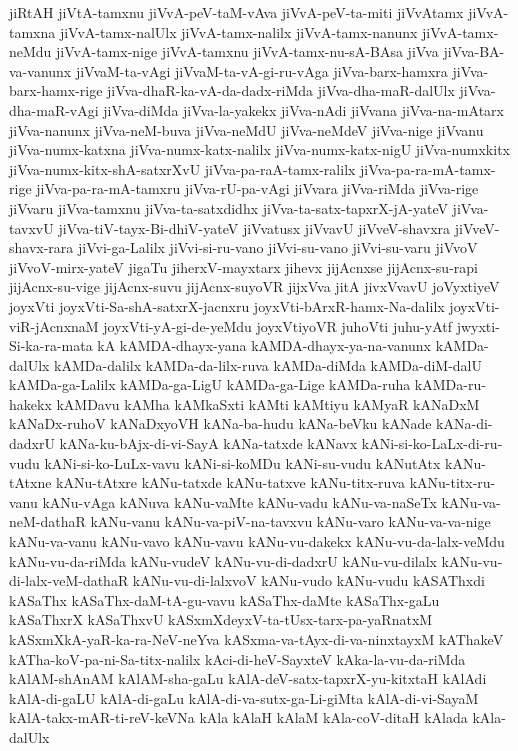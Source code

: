 {jiRtAH
jiVtA-tamxnu
jiVvA-peV-taM-vAva
jiVvA-peV-ta-miti
jiVvAtamx
jiVvA-tamxna
jiVvA-tamx-nalUlx
jiVvA-tamx-nalilx
jiVvA-tamx-nanunx
jiVvA-tamx-neMdu
jiVvA-tamx-nige
jiVvA-tamxnu
jiVvA-tamx-nu-sA-BAsa
jiVva
jiVva-BA-va-vanunx
jiVvaM-ta-vAgi
jiVvaM-ta-vA-gi-ru-vAga
jiVva-barx-hamxra
jiVva-barx-hamx-rige
jiVva-dhaR-ka-vA-da-dadx-riMda
jiVva-dha-maR-dalUlx
jiVva-dha-maR-vAgi
jiVva-diMda
jiVva-la-yakekx
jiVva-nAdi
jiVvana
jiVva-na-mAtarx
jiVva-nanunx
jiVva-neM-buva
jiVva-neMdU
jiVva-neMdeV
jiVva-nige
jiVvanu
jiVva-numx-katxna
jiVva-numx-katx-nalilx
jiVva-numx-katx-nigU
jiVva-numxkitx
jiVva-numx-kitx-shA-satxrXvU
jiVva-pa-raA-tamx-ralilx
jiVva-pa-ra-mA-tamx-rige
jiVva-pa-ra-mA-tamxru
jiVva-rU-pa-vAgi
jiVvara
jiVva-riMda
jiVva-rige
jiVvaru
jiVva-tamxnu
jiVva-ta-satxdidhx
jiVva-ta-satx-tapxrX-jA-yateV
jiVva-tavxvU
jiVva-tiV-tayx-Bi-dhiV-yateV
jiVvatusx
jiVvavU
jiVveV-shavxra
jiVveV-shavx-rara
jiVvi-ga-Lalilx
jiVvi-si-ru-vano
jiVvi-su-vano
jiVvi-su-varu
jiVvoV
jiVvoV-mirx-yateV
jigaTu
jiherxV-mayxtarx
jihevx
jijAcnxse
jijAcnx-su-rapi
jijAcnx-su-vige
jijAcnx-suvu
jijAcnx-suyoVR
jijxVva
jitA
jivxVvavU
joVyxtiyeV
joyxVti
joyxVti-Sa-shA-satxrX-jacnxru
joyxVti-bArxR-hamx-Na-dalilx
joyxVti-viR-jAcnxnaM
joyxVti-yA-gi-de-yeMdu
joyxVtiyoVR
juhoVti
juhu-yAtf
jwyxti-Si-ka-ra-mata
kA
kAMDA-dhayx-yana
kAMDA-dhayx-ya-na-vanunx
kAMDa-dalUlx
kAMDa-dalilx
kAMDa-da-lilx-ruva
kAMDa-diMda
kAMDa-diM-dalU
kAMDa-ga-Lalilx
kAMDa-ga-LigU
kAMDa-ga-Lige
kAMDa-ruha
kAMDa-ru-hakekx
kAMDavu
kAMha
kAMkaSxti
kAMti
kAMtiyu
kAMyaR
kANaDxM
kANaDx-ruhoV
kANaDxyoVH
kANa-ba-hudu
kANa-beVku
kANade
kANa-di-dadxrU
kANa-ku-bAjx-di-vi-SayA
kANa-tatxde
kANavx
kANi-si-ko-LaLx-di-ru-vudu
kANi-si-ko-LuLx-vavu
kANi-si-koMDu
kANi-su-vudu
kANutAtx
kANu-tAtxne
kANu-tAtxre
kANu-tatxde
kANu-tatxve
kANu-titx-ruva
kANu-titx-ru-vanu
kANu-vAga
kANuva
kANu-vaMte
kANu-vadu
kANu-va-naSeTx
kANu-va-neM-dathaR
kANu-vanu
kANu-va-piV-na-tavxvu
kANu-varo
kANu-va-va-nige
kANu-va-vanu
kANu-vavo
kANu-vavu
kANu-vu-dakekx
kANu-vu-da-lalx-veMdu
kANu-vu-da-riMda
kANu-vudeV
kANu-vu-di-dadxrU
kANu-vu-dilalx
kANu-vu-di-lalx-veM-dathaR
kANu-vu-di-lalxvoV
kANu-vudo
kANu-vudu
kASAThxdi
kASaThx
kASaThx-daM-tA-gu-vavu
kASaThx-daMte
kASaThx-gaLu
kASaThxrX
kASaThxvU
kASxmXdeyxV-ta-tUsx-tarx-pa-yaRnatxM
kASxmXkA-yaR-ka-ra-NeV-neYva
kASxma-va-tAyx-di-va-ninxtayxM
kAThakeV
kATha-koV-pa-ni-Sa-titx-nalilx
kAci-di-heV-SayxteV
kAka-la-vu-da-riMda
kAlAM-shAnAM
kAlAM-sha-gaLu
kAlA-deV-satx-tapxrX-yu-kitxtaH
kAlAdi
kAlA-di-gaLU
kAlA-di-gaLu
kAlA-di-va-sutx-ga-Li-giMta
kAlA-di-vi-SayaM
kAlA-takx-mAR-ti-reV-keVNa
kAla
kAlaH
kAlaM
kAla-coV-ditaH
kAlada
kAla-dalUlx
}
